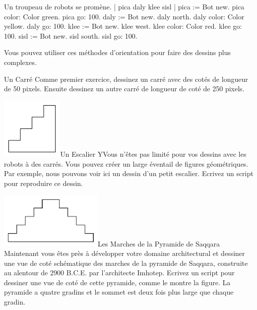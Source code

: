 \documentclass[a4paper,10pt,twoside]{book}
\begin{document}
\begin{script}[gaggle]{Un troupeau de robots se prom\`ene.}
| pica daly klee sisl | 
pica := Bot new. 
pica color: Color green. 
pica go: 100. 
daly := Bot new. 
daly north. 
daly color: Color yellow. 
daly go: 100. 
klee := Bot new. 
klee west. 
klee color: Color red. 
klee go: 100. 
sisl := Bot new. 
sisl south. 
sisl go: 100. 
\end{script}

Vous pouvez utiliser ces m\'ethodes d'orientation pour faire des dessins plus complexes. 

\begin{exonofigtitle}{Un Carr\'e}\label{xp:square}
Comme premier exercice, dessinez un carr\'e avec des cot\'es de longueur de 50 pixels. Ensuite dessinez un autre carr\'e de longueur de cot\'e de 250 pixels. 
\end{exonofigtitle}


\begin{exofigwithsize}[0.5]{\includegraphics[width=3cm]{turtleMSmallStairs}}{Un Escalier}\label{xp:letterA}
YVous n'\^etes pas limit\'e pour vos dessins avec les robots \`a des carr\'es. Vous pouvez cr\'eer un large \'eventail de figures g\'eom\'etriques. 
Par exemple, nous pouvons voir ici un dessin d'un petit escalier. Ecrivez un script pour reproduire ce dessin.
\end{exofigwithsize}


\begin{exofigwithsize}[0.5]{\includegraphics[width=5cm]{turtleMSaqqarah}}{Les Marches de la Pyramide de Saqqara}\label{xp:saqq}
Maintenant vous \^etes pr\`es \`a d\'evelopper votre domaine architectural et dessiner une vue de cot\'e sch\'ematique des marches 
de la pyramide de Saqqara, construite au alentour de 2900 B.C.E. par l'architecte Imhotep. Ecrivez un script pour 
dessiner une vue de cot\'e de cette pyramide, comme le montre la figure. La pyramide a quatre gradins et le sommet 
est deux fois plus large que chaque gradin.
\end{exofigwithsize}
\end{document}
